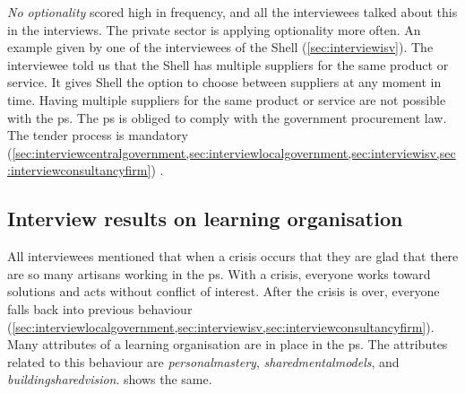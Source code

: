 \textit{No \gls{optionality}} scored high in frequency, and all the interviewees talked about this in the interviews. The private sector is applying optionality more often. An example given by one of the interviewees of the Shell (\cref{sec:interviewisv}). The interviewee told us that the Shell has multiple suppliers for the same product or service. It gives Shell the option to choose between suppliers at any moment in time. Having multiple suppliers for the same product or service are not possible with the \gls{ps}. The \gls{ps} is obliged to comply with the government procurement law. The tender process is mandatory (\cref{sec:interviewcentralgovernment,sec:interviewlocalgovernment,sec:interviewisv,sec:interviewconsultancyfirm}) \parencite{EU2014}.
\subsection{Interview results on learning organisation}
\label{sub:interviewresultslearning}
All interviewees mentioned that when a crisis occurs that they are glad that there are so many artisans working in the \gls{ps}. With a crisis, everyone works toward solutions and acts without conflict of interest. After the crisis is over, everyone falls back into previous behaviour (\cref{sec:interviewlocalgovernment,sec:interviewisv,sec:interviewconsultancyfirm}). Many \glspl{attribute} of a learning organisation are in place in the \gls{ps}. The \glspl{attribute} related to this behaviour are \textit{\gls{personalmastery}}, \textit{\glspl{sharedmentalmodel}}, and \textit{\gls{buildingsharedvision}}.  shows the same.

